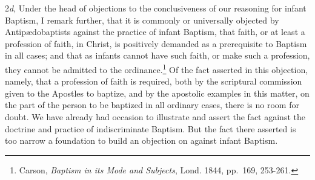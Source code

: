 \documentclass[english,]{book}
\begin{document}
2\emph{d}, Under the head of objections to the conclusiveness of our reasoning for infant Baptism, I remark further, that it is commonly or universally objected by Antipædobaptists against the practice of infant Baptism, that faith, or at least a profession of faith, in Christ, is positively demanded as a prerequisite to Baptism in all cases; and that as infants cannot have such faith, or make such a profession, they cannot be admitted to the ordinance.\footnote{Carson, \emph{Baptism in its Mode and Subjects}, Lond. 1844, pp.~169, 253-261.} Of the fact asserted in this objection, namely, that a profession of faith is required, both by the scriptural commission given to the Apostles to baptize, and by the apostolic examples in this matter, on the part of the person to be baptized in all ordinary cases, there is no room for doubt. We have already had occasion to illustrate and assert the fact against the doctrine and practice of indiscriminate Baptism. But the fact there asserted is too narrow a foundation to build an objection on against infant Baptism.
\end{document}
